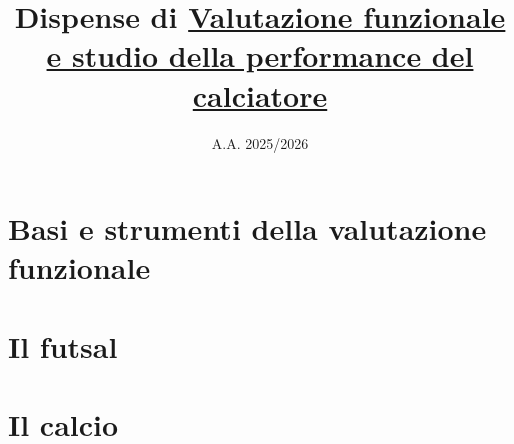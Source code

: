\documentclass[11pt, oneside, openany]{book}
\title{Dispense di \underline{Valutazione funzionale}\\ \underline{e studio della performance del calciatore}}
\author{}
\date{A.A. 2025/2026}
\begin{document}
\frontmatter                 %

\maketitle
\thispagestyle{empty}
\clearpage

\tableofcontents
\clearpage

\mainmatter                  %


\part{Basi e strumenti della valutazione funzionale}










\part{Il futsal}









\part{Il calcio}








\end{document}

